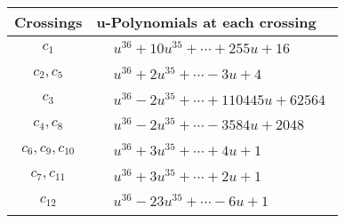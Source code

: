 \documentclass[1p]{elsarticle_modified}
\theoremstyle{definition}
\begin{document}
\begin{tabular}{m{50pt}|m{274pt}}
Crossings & \hspace{64pt}u-Polynomials at each crossing \\
\hline $$\begin{aligned}c_{1}\end{aligned}$$&$\begin{aligned}
&u^{36}+10 u^{35}+\cdots+255 u+16
\end{aligned}$\\
\hline $$\begin{aligned}c_{2},c_{5}\end{aligned}$$&$\begin{aligned}
&u^{36}+2 u^{35}+\cdots-3 u+4
\end{aligned}$\\
\hline $$\begin{aligned}c_{3}\end{aligned}$$&$\begin{aligned}
&u^{36}-2 u^{35}+\cdots+110445 u+62564
\end{aligned}$\\
\hline $$\begin{aligned}c_{4},c_{8}\end{aligned}$$&$\begin{aligned}
&u^{36}-2 u^{35}+\cdots-3584 u+2048
\end{aligned}$\\
\hline $$\begin{aligned}c_{6},c_{9},c_{10}\end{aligned}$$&$\begin{aligned}
&u^{36}+3 u^{35}+\cdots+4 u+1
\end{aligned}$\\
\hline $$\begin{aligned}c_{7},c_{11}\end{aligned}$$&$\begin{aligned}
&u^{36}+3 u^{35}+\cdots+2 u+1
\end{aligned}$\\
\hline $$\begin{aligned}c_{12}\end{aligned}$$&$\begin{aligned}
&u^{36}-23 u^{35}+\cdots-6 u+1
\end{aligned}$\\
\hline
\end{tabular}\\~\\
\newpage\renewcommand{\arraystretch}{1}
\end{document}
